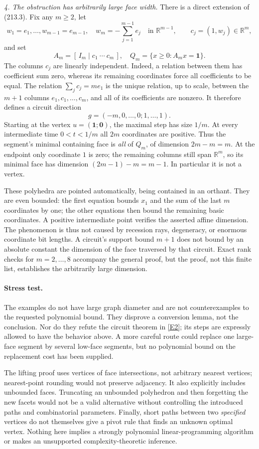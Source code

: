 \documentclass[11pt,a4paper]{article}
\newcommand{\R}{\mathbb{R}}
\newcommand{\eref}[2]{\hyperlink{extra:#1:#2}{[E#2]}}
\begin{document}
\textit{4. The obstruction has arbitrarily large face width.}
There is a direct extension of (213.3). Fix any $m\ge2$, let
\[
 w_1=e_1,\ldots,w_{m-1}=e_{m-1},\quad
 w_m=-\sum_{j=1}^{m-1}e_j\quad\text{in }\R^{m-1},
 \qquad c_j=(1,w_j)\in\R^m,
\]
and set
\[
 A_m=[\,I_m\mid c_1\ \cdots\ c_m\,],\quad
 Q_m=\{x\ge0:A_mx=\mathbf1\}.
\]
The columns $c_j$ are linearly independent. Indeed, a relation between them
has coefficient sum zero, whereas its remaining coordinates force all
coefficients to be equal. The relation
$\sum_jc_j=m e_1$ is the unique relation, up to scale, between the $m+1$
columns $e_1,c_1,\ldots,c_m$, and all of its coefficients are nonzero.
It therefore defines a circuit direction
\[
 g=(-m,0,\ldots,0;1,\ldots,1).
\]
Starting at the vertex $u=(\mathbf1;\mathbf0)$, the maximal step has size
$1/m$. At every intermediate time $0<t<1/m$ all $2m$ coordinates are
positive. Thus the segment's minimal containing face is \emph{all} of
$Q_m$, of dimension $2m-m=m$. At the endpoint only coordinate $1$ is zero;
the remaining columns still span $\R^m$, so its minimal face has dimension
$(2m-1)-m=m-1$. In particular it is not a vertex.

These polyhedra are pointed automatically, being contained in an orthant.
They are even bounded: the first equation bounds $x_1$ and the sum of the
last $m$ coordinates by one; the other equations then bound the remaining
basic coordinates. A positive intermediate point verifies the asserted
affine dimension. The phenomenon is thus not caused by recession rays,
degeneracy, or enormous coordinate bit lengths. A circuit's support bound
$m+1$ does not bound by an absolute constant the dimension of the face
traversed by that circuit. Exact rank checks for $m=2,\ldots,8$ accompany
the general proof, but the proof, not this finite list, establishes the
arbitrarily large dimension.

\paragraph{Stress test.}
The examples do not have large graph diameter and are not counterexamples
to the requested polynomial bound. They disprove a conversion lemma, not
the conclusion. Nor do they refute the circuit theorem in \eref{statement}{2};
its steps are expressly allowed to have the behavior above. A more careful
route could replace one large-face segment by several low-face segments,
but no polynomial bound on the replacement cost has been supplied.

The lifting proof uses vertices of face intersections, not arbitrary nearest
vertices; nearest-point rounding would not preserve adjacency. It also
explicitly includes unbounded faces. Truncating an unbounded polyhedron and
then forgetting the new facets would not be a valid alternative without
controlling the introduced paths and combinatorial parameters. Finally,
short paths between two \emph{specified} vertices do not themselves give a
pivot rule that finds an unknown optimal vertex. Nothing here implies a
strongly polynomial linear-programming algorithm or makes an unsupported
complexity-theoretic inference.
\end{document}
